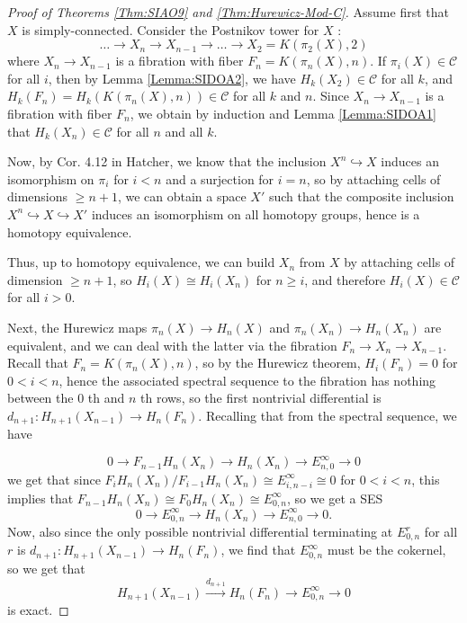 \documentclass[reqno]{amsart}
\theoremstyle{definition}
\theoremstyle{remark}
\begin{document}
\begin{proof}[Proof of Theorems
    \ref{Thm:SIAO9} and \ref{Thm:Hurewicz-Mod-C}]
    Assume first that $X$ is simply-connected. Consider
    the Postnikov tower for $X$ :
    \[
    \ldots \to X_n \to X_{n-1} \to \ldots \to 
    X_2 = K\left( \pi_2 (X),2 \right) 
    \] 
    where $X_n \to X_{n-1}$ is a fibration with
    fiber $F_n = K\left( \pi_n(X), n \right) $.
    If $\pi_i (X) \in \mathcal{C}$ for all $i$, then
    by Lemma \ref{Lemma:SIDOA2}, we have
    $H_k(X_2) \in \mathcal{C}$ for all $k$, and
    $H_k(F_n) = H_k\left( K \left( \pi_n (X),n \right)  \right) 
    \in \mathcal{C}$ for all $k$ and $n$.
    Since $X_n \to X_{n-1}$ is a fibration with fiber
    $F_n$, we obtain by induction and
    Lemma \ref{Lemma:SIDOA1} that
    $H_k\left( X_n \right) \in \mathcal{C}$ for all
    $n$ and all $k$.


    Now, by Cor. 4.12 in Hatcher, we know that
    the inclusion $X^{n} \hookrightarrow X$ induces an isomorphism
    on $\pi_i$ for $i<n$ and a surjection for $i=n$, so
    by attaching cells of dimensions $\ge n+1$, we can
    obtain a space $X'$ such that the composite inclusion
    $X^{n} \hookrightarrow X \hookrightarrow X'$ induces
    an isomorphism on all homotopy groups, hence
    is a homotopy equivalence.

    Thus, up
    to homotopy equivalence, we can build
    $X_n$ from $X$ by attaching cells of dimension
    $\ge n+1$, so $H_i(X) \cong
    H_i(X_n)$ for $n\ge i$, and therefore
    $H_i \left( X \right) \in \mathcal{C}$ for all $i >0$.

    Next, the Hurewicz maps $\pi_n (X) \to H_n(X)$ and
    $\pi_n(X_n) \to H_n(X_n)$ are equivalent, and
    we can deal with the latter via the fibration
    $F_n \to X_n \to X_{n-1}$. Recall
     that $F_n = K\left( \pi_n(X), n \right) $, so
     by the Hurewicz theorem,
     $H_i (F_n) = 0$ for $0<i < n$, hence the associated
     spectral sequence to the fibration has nothing
     between the  $0$ th and $n$ th rows, so
     the first nontrivial differential is
     $d_{n+1} \colon H_{n+1}(X_{n-1}) \to 
     H_n (F_n)$. 
     Recalling that from the spectral sequence, we have

     \[
     0 \to F_{n-1}H_n(X_n) \to 
     H_n(X_n) \to E_{n,0}^{\infty} \to 0
     \] 
     we get 
     that since
     $F_{i}H_n(X_n) / F_{i-1}H_n(X_n) \cong
     E_{i,n-i}^{\infty}
     \cong 0$ for $0<i<n$, this implies that
     $F_{n-1}H_n(X_n) \cong
     F_0 H_n(X_n) \cong
     E_{0,n}^{\infty}$, so we get a SES
     \[
     0 \to E_{0,n}^{\infty} \to 
     H_n(X_n) \to E_{n,0}^{\infty} \to 0.
     \] 
     Now, also
     since the only possible nontrivial differential terminating
     at
     $E_{0,n}^{r}$ for all $r$ is
     $d_{n+1} \colon
     H_{n+1}(X_{n-1}) \to H_{n}(F_n)$, we find that
     $E_{0,n}^{\infty}$ must be the cokernel, so
     we get that
     \[
     H_{n+1}(X_{n-1}) \stackrel{d_{n+1}}{\to} H_n(F_n)
     \to E_{0,n}^{\infty} \to 0
     \] 
     is exact.


\end{proof}
\end{document}
